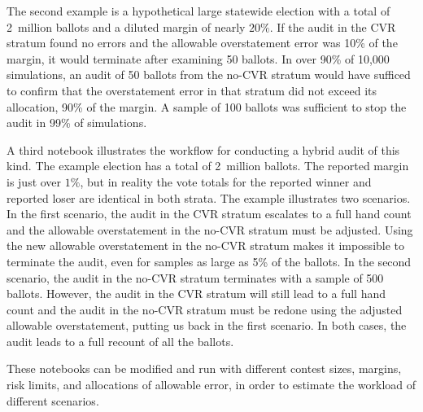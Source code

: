 \documentclass[12pt]{article}
\begin{document}
The second example is a hypothetical large statewide election with a total of 
2~million ballots and a diluted margin of nearly $20\%$.
If the audit in the CVR stratum found no errors and the allowable overstatement error was 10\% of the margin, 
it would terminate after examining 50 ballots.
In over 90\% of 10,000 simulations, an audit of 50 ballots from the no-CVR stratum
would have sufficed to confirm that the overstatement error in that stratum
did not exceed its allocation, 90\% of the margin.
A sample of 100 ballots was sufficient to stop the audit in 99\% of simulations.

A third notebook illustrates the workflow for conducting a hybrid audit of this kind.
The example election has a total of 2~million ballots.
The reported margin is just over $1\%$, but in reality the vote totals for the reported winner
and reported loser are identical in both strata.
The example illustrates two scenarios.
In the first scenario, the audit in the CVR stratum escalates to a full hand count and the allowable overstatement
in the no-CVR stratum must be adjusted.
Using the new allowable overstatement in the no-CVR stratum makes it impossible to terminate the audit,
even for samples as large as 5\% of the ballots.
In the second scenario, the audit in the no-CVR stratum terminates with a sample of 500 ballots.
However, the audit in the CVR stratum will still lead to a full hand count and the audit in the no-CVR
stratum must be redone using the adjusted allowable overstatement, putting us back in the first scenario.
In both cases, the audit leads to a full recount of all the ballots.

These notebooks can be modified and run with different contest sizes, margins, risk limits, and allocations of allowable error, in order to
estimate the workload of different scenarios.


\end{document}
